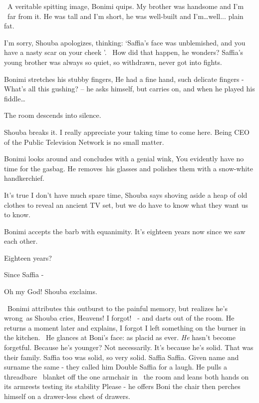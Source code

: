 \documentclass[letterpaper]{article}
\begin{document}
~{\textquotedbl}A veritable spitting image,{\textquotedbl} Bonimi quips. {\textquotedbl}My brother was handsome and I'm
~far from it. He was tall and I'm short, he was well-built and I'm{\dots}well... plain fat. {\textquotedbl} 

{\textquotedbl}I'm sorry,{\textquotedbl} Shouba apologizes, thinking: `Saffia's face was unblemished,
and{ }you have a nasty scar on your cheek '. \ How did that happen, he wonders?
Saffia's young brother was always so quiet, so withdrawn, never got into fights.

Bonimi stretches his stubby fingers, {\textquotedbl}He had a fine hand, such delicate fingers - {\textquotedbl} What's
all this gushing? -- he asks himself, but carries on, {\textquotedbl}and when he played his
fiddle{\dots}{\textquotedbl}

The room descends into silence. 

Shouba breaks it. {\textquotedbl}I really appreciate your taking time to come here. Being CEO of the Public Television
Network is no small matter.{\textquotedbl}

Bonimi looks around and concludes with a genial wink, {\textquotedbl}You evidently have no time for the
gasbag.{\textquotedbl} He removes~his glasses and polishes them with a snow-white handkerchief. 

{\textquotedbl}It's true I don't have much spare time,{\textquotedbl} Shouba says shoving aside a heap of old clothes to
reveal an ancient TV set, {\textquotedbl}but we do have to know what they want us to know.{\textquotedbl}

Bonimi accepts the barb with equanimity. {\textquotedbl}It's eighteen years now since we saw each other.{\textquotedbl} 

{\textquotedbl}Eighteen years?{\textquotedbl}

{\textquotedbl}Since Saffia -{\textquotedbl} 

{\textquotedbl}Oh my God!{\textquotedbl} Shouba exclaims.

~Bonimi attributes this outburst to the painful memory, but realizes he's wrong~as Shouba cries,
{\textquotedbl}Heavens!{ }I forgot!{\textquotedbl}
{\ }{}- and darts out of the room. He returns a moment later and explains,
{\textquotedbl}I forgot I left something on the burner in the kitchen.{\textquotedbl}~ He glances at Boni's face: as
placid as ever. \textit{He} hasn't become forgetful. Because he's younger? Not necessarily. It's because he's solid.
That was their family. Saffia too was solid, so very solid. Saffia Saffia. Given name and surname the same - they
called him {\textquotedbl}Double Saffia{\textquotedbl} for a laugh. He pulls a threadbare \ blanket off the one
armchair in~ the room and leans both hands on its armrests testing its stability {\textquotedbl}Please -{\textquotedbl}
he offers Boni the chair then perches himself on a drawer-less chest of drawers. 
\end{document}

